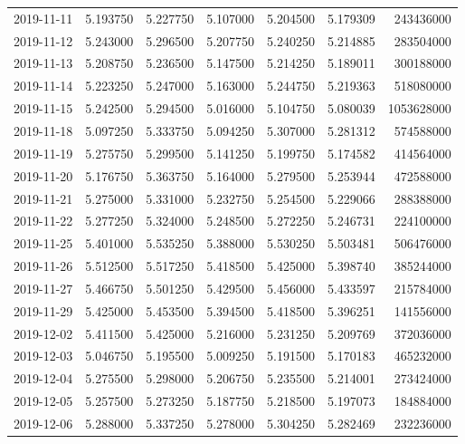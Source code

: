 \begin{tabular}{lrrrrrr}
2019-11-11 &    5.193750 &    5.227750 &    5.107000 &    5.204500 &    5.179309 &   243436000 \\
2019-11-12 &    5.243000 &    5.296500 &    5.207750 &    5.240250 &    5.214885 &   283504000 \\
2019-11-13 &    5.208750 &    5.236500 &    5.147500 &    5.214250 &    5.189011 &   300188000 \\
2019-11-14 &    5.223250 &    5.247000 &    5.163000 &    5.244750 &    5.219363 &   518080000 \\
2019-11-15 &    5.242500 &    5.294500 &    5.016000 &    5.104750 &    5.080039 &  1053628000 \\
2019-11-18 &    5.097250 &    5.333750 &    5.094250 &    5.307000 &    5.281312 &   574588000 \\
2019-11-19 &    5.275750 &    5.299500 &    5.141250 &    5.199750 &    5.174582 &   414564000 \\
2019-11-20 &    5.176750 &    5.363750 &    5.164000 &    5.279500 &    5.253944 &   472588000 \\
2019-11-21 &    5.275000 &    5.331000 &    5.232750 &    5.254500 &    5.229066 &   288388000 \\
2019-11-22 &    5.277250 &    5.324000 &    5.248500 &    5.272250 &    5.246731 &   224100000 \\
2019-11-25 &    5.401000 &    5.535250 &    5.388000 &    5.530250 &    5.503481 &   506476000 \\
2019-11-26 &    5.512500 &    5.517250 &    5.418500 &    5.425000 &    5.398740 &   385244000 \\
2019-11-27 &    5.466750 &    5.501250 &    5.429500 &    5.456000 &    5.433597 &   215784000 \\
2019-11-29 &    5.425000 &    5.453500 &    5.394500 &    5.418500 &    5.396251 &   141556000 \\
2019-12-02 &    5.411500 &    5.425000 &    5.216000 &    5.231250 &    5.209769 &   372036000 \\
2019-12-03 &    5.046750 &    5.195500 &    5.009250 &    5.191500 &    5.170183 &   465232000 \\
2019-12-04 &    5.275500 &    5.298000 &    5.206750 &    5.235500 &    5.214001 &   273424000 \\
2019-12-05 &    5.257500 &    5.273250 &    5.187750 &    5.218500 &    5.197073 &   184884000 \\
2019-12-06 &    5.288000 &    5.337250 &    5.278000 &    5.304250 &    5.282469 &   232236000 \\

\end{tabular}
